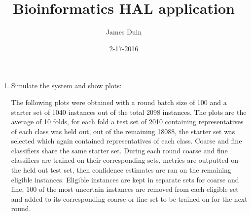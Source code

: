 \documentclass[11pt]{article}   	%
\title{Bioinformatics HAL application}
\author{James Duin}
\date{2-17-2016}							%
\begin{document}
\maketitle


\begin{enumerate}[ label=\textbf{\Roman*.},listparindent=1.5em] %

\item Simulate the system and show plots: \\
	\par The following plots were obtained with a round batch size of 100
	and a starter set of 1040 instances out of the total 2098 instances.
	The plots are the average of 10 folds, for each fold a test set of 2010
	containing representatives of each class was held out, out of the remaining
	18088, the starter set was selected which again contained representatives of
	each class. Coarse and fine classifiers share the same starter set. During
	 each round coarse and fine classifiers are trained on their corresponding
	 sets, metrics are outputted on the held out test set, then confidence estimates
	 are ran on the remaining eligible instances. Eligible instances are kept in
	 separate sets for coarse and fine, 100 of the most uncertain instances are removed
	 from each eligible set and added to its corresponding coarse or fine set to be
	 trained on for the next round.\\


\end{enumerate}
\end{document}
